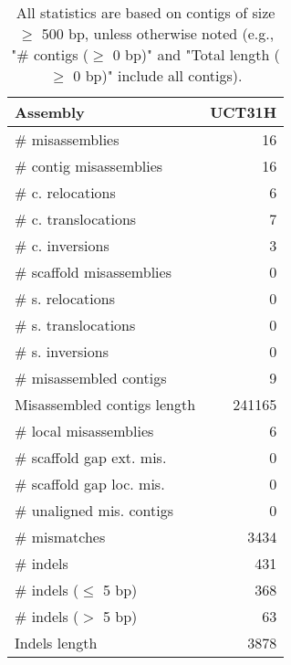 \documentclass[12pt,a4paper]{article}
\begin{document}
\begin{table}[ht]
\begin{center}
\caption{All statistics are based on contigs of size $\geq$ 500 bp, unless otherwise noted (e.g., "\# contigs ($\geq$ 0 bp)" and "Total length ($\geq$ 0 bp)" include all contigs).}
\begin{tabular}{|l*{1}{|r}|}
\hline
Assembly & UCT31H \\ \hline
\# misassemblies & 16 \\ \hline
\hspace{2mm}\# contig misassemblies & 16 \\ \hline
\hspace{5mm}\# c. relocations & 6 \\ \hline
\hspace{5mm}\# c. translocations & 7 \\ \hline
\hspace{5mm}\# c. inversions & 3 \\ \hline
\hspace{2mm}\# scaffold misassemblies & 0 \\ \hline
\hspace{5mm}\# s. relocations & 0 \\ \hline
\hspace{5mm}\# s. translocations & 0 \\ \hline
\hspace{5mm}\# s. inversions & 0 \\ \hline
\# misassembled contigs & 9 \\ \hline
Misassembled contigs length & 241165 \\ \hline
\# local misassemblies & 6 \\ \hline
\# scaffold gap ext. mis. & 0 \\ \hline
\# scaffold gap loc. mis. & 0 \\ \hline
\# unaligned mis. contigs & 0 \\ \hline
\# mismatches & 3434 \\ \hline
\# indels & 431 \\ \hline
\hspace{5mm}\# indels ($\leq$ 5 bp) & 368 \\ \hline
\hspace{5mm}\# indels ($>$ 5 bp) & 63 \\ \hline
Indels length & 3878 \\ \hline
\end{tabular}
\end{center}
\end{table}
\end{document}
